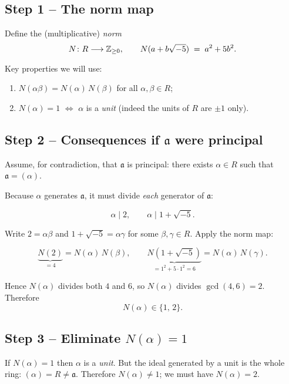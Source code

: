 \documentclass[12pt]{article}
\theoremstyle{definition} %
\theoremstyle{plain} %
\begin{document}
\subsection*{Step 1 – The norm map}

Define the (multiplicative) \emph{norm}
\[
    N\colon R \longrightarrow \Bbb Z_{\ge 0},
    \qquad
    N(a+b\sqrt{-5}) \;=\; a^2 + 5b^2 .
\]

Key properties we will use:

\begin{enumerate}
  \item \(N(\alpha\beta)=N(\alpha)\,N(\beta)\) \quad for all \(\alpha,\beta\in R\);
  \item \(N(\alpha)=1\) \(\Longleftrightarrow\) \(\alpha\) is a \emph{unit}
        (indeed the units of \(R\) are \(\pm1\) only).
\end{enumerate}

\subsection*{Step 2 – Consequences if \(\mathfrak a\) were principal}

Assume, for contradiction, that \(\mathfrak a\) is principal:  
there exists \(\alpha\in R\) such that \(\mathfrak a=(\alpha)\).

Because \(\alpha\) generates \(\mathfrak a\), it must divide \emph{each} generator
of \(\mathfrak a\):

\[
      \alpha \mid 2,
      \qquad
      \alpha \mid 1+\sqrt{-5}.
\]

Write \(2=\alpha\beta\) and \(1+\sqrt{-5}=\alpha\gamma\) for some
\(\beta,\gamma\in R\).
Apply the norm map:

\[
    \underbrace{N(2)}_{=4}=N(\alpha)\,N(\beta),
    \qquad
    \underbrace{N(1+\sqrt{-5})}_{=1^2+5\cdot1^2=6}=N(\alpha)\,N(\gamma).
\]

Hence \(N(\alpha)\) divides both \(4\) and \(6\),
so \(N(\alpha)\) divides \(\gcd(4,6)=2\).
Therefore
\[
    N(\alpha)\in\{1,\,2\}.
\]

\subsection*{Step 3 – Eliminate \(N(\alpha)=1\)}

If \(N(\alpha)=1\) then \(\alpha\) is a \emph{unit}.  
But the ideal generated by a unit is the whole ring:
\(
   (\alpha)=R \neq\mathfrak a
\).
Therefore \(N(\alpha)\ne1\); we must have \(N(\alpha)=2\).
\end{document}
